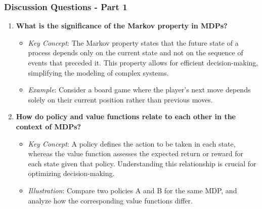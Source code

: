 \documentclass[aspectratio=169]{beamer}
\begin{document}
\begin{frame}[fragile]
    \frametitle{Discussion Questions - Part 1}
    \begin{enumerate}
        \item \textbf{What is the significance of the Markov property in MDPs?}
        \begin{itemize}
            \item \textit{Key Concept}: The Markov property states that the future state of a process depends only on the current state and not on the sequence of events that preceded it. This property allows for efficient decision-making, simplifying the modeling of complex systems.
            \item \textit{Example}: Consider a board game where the player’s next move depends solely on their current position rather than previous moves.
        \end{itemize}

        \item \textbf{How do policy and value functions relate to each other in the context of MDPs?}
        \begin{itemize}
            \item \textit{Key Concept}: A policy defines the action to be taken in each state, whereas the value function assesses the expected return or reward for each state given that policy. Understanding this relationship is crucial for optimizing decision-making.
            \item \textit{Illustration}: Compare two policies A and B for the same MDP, and analyze how the corresponding value functions differ.
        \end{itemize}
    \end{enumerate}
\end{frame}
\end{document}
